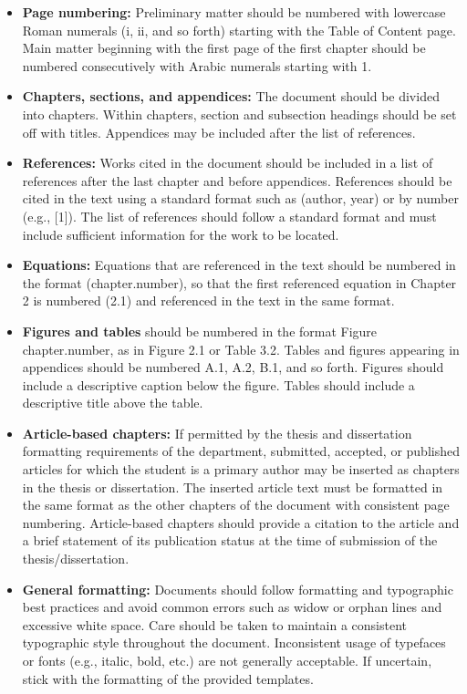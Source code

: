 \begin{itemize}
\item {\bfseries Page numbering:} Preliminary matter should be numbered with lowercase Roman numerals (i, ii, and so forth) starting with the Table of Content page. Main matter beginning with the first page of the first chapter should be numbered consecutively with Arabic numerals starting with 1. 

\item {\bfseries Chapters, sections, and appendices:} The document should be divided into chapters. Within chapters, section and subsection headings should be set off with titles. Appendices may be included after the list of references.

\item {\bfseries References:} Works cited in the document should be included in a list of references after the last chapter and before appendices. References should be cited in the text using a standard format such as (author, year) or by number (e.g., [1]). The list of references should follow a standard format and must include sufficient information for the work to be located. 

\item {\bfseries Equations:} Equations that are referenced in the text should be numbered in the format (chapter.number), so that the first referenced equation in Chapter 2 is numbered (2.1) and referenced in the text in the same format.  

\item {\bfseries Figures and tables} should be numbered in the format Figure chapter.number, as in Figure 2.1 or Table 3.2. Tables and figures appearing in appendices should be numbered A.1, A.2, B.1, and so forth. Figures should include a descriptive caption below the figure. Tables should include a descriptive title above the table. 

\item {\bfseries Article-based chapters:} If permitted by the thesis and dissertation formatting requirements of the department, submitted, accepted, or published articles for which the student is a primary author may be inserted as chapters in the thesis or dissertation. The inserted article text must be formatted in the same format as the other chapters of the document with consistent page numbering. Article-based chapters should provide a citation to the article and a brief statement of its publication status at the time of submission of the thesis/dissertation.

\item {\bfseries General formatting:} Documents should follow formatting and typographic best practices and avoid common errors such as widow or orphan lines and excessive white space. Care should be taken to maintain a consistent typographic style throughout the document. Inconsistent usage of typefaces or fonts (e.g., italic, bold, etc.) are not generally acceptable. If uncertain, stick with the formatting of the provided templates.
\end{itemize}